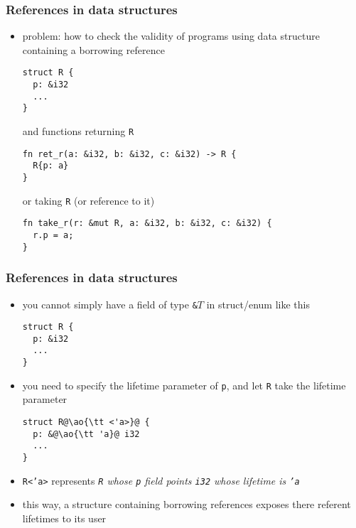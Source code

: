 \documentclass[12pt,dvipdfmx]{beamer}
\newcommand{\ao}[1]{{\color{blue}#1}}
\begin{document}
\begin{frame}[fragile]
  \frametitle{References in data structures}
  \begin{itemize}
  \item problem: how to check the validity of programs using
    data structure containing a borrowing reference
\begin{lstlisting}
struct R {
  p: &i32
  ...
}
\end{lstlisting}
and functions returning {\tt R}
\begin{lstlisting}
fn ret_r(a: &i32, b: &i32, c: &i32) -> R {
  R{p: a}
}    
\end{lstlisting}
or taking {\tt R} (or reference to it)
\begin{lstlisting}
fn take_r(r: &mut R, a: &i32, b: &i32, c: &i32) {
  r.p = a;
}    
\end{lstlisting}
  \end{itemize}
\end{frame}

\begin{frame}[fragile]
  \frametitle{References in data structures}
  \begin{itemize}
  \item you cannot simply have a field of type {\tt \&$T$}
    in struct/enum like this
\begin{lstlisting}
struct R {
  p: &i32
  ...
}
\end{lstlisting}
\item you need to specify the lifetime parameter of {\tt p},
  and let {\tt R} take the lifetime parameter
\begin{lstlisting}
struct R@\ao{\tt <'a>}@ {
  p: &@\ao{\tt 'a}@ i32
  ...
}
\end{lstlisting}
\item {\tt R<'a>} represents \ao{\it {\tt R} whose {\tt p} field
  points {\tt i32} whose lifetime is {\tt 'a}}
\item this way, a structure containing borrowing references
  exposes there referent lifetimes to its user
\end{itemize}
\end{frame}
\end{document}
